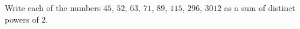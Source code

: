 Write each of the numbers $45$, $52$, $63$, $71$, $89$, $115$, $296$, $3012$ as a sum of distinct powers of $2$.
